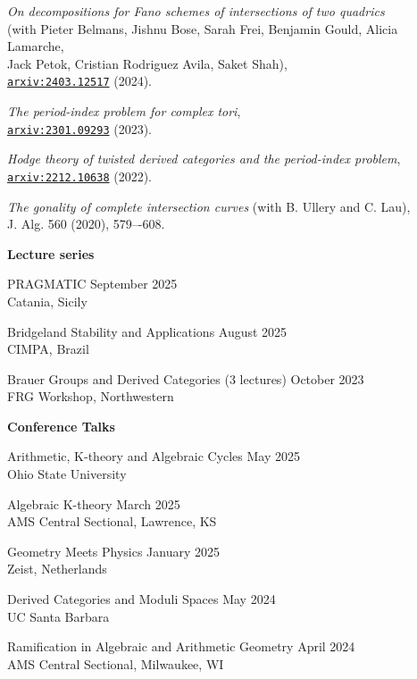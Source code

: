 \documentclass[11 pt]{letter}
\begin{document}
	\emph{On decompositions for Fano schemes of intersections of two quadrics} \\ 
	\indent (with Pieter Belmans, Jishnu Bose, Sarah Frei, Benjamin Gould, Alicia Lamarche, \\
	\indent Jack Petok, Cristian Rodriguez Avila, Saket Shah), \\
	\indent \href{https://arxiv.org/abs/2403.12517}{\nolinkurl{arxiv:2403.12517}} (2024).

	\emph{The period-index problem for complex tori}, \\
	\indent \href{https://arxiv.org/abs/2301.09293}{\nolinkurl{arxiv:2301.09293}} (2023).

	\emph{Hodge theory of twisted derived categories and the period-index problem}, \\ 
	\indent \href{https://arxiv.org/abs/2212.10638}{\nolinkurl{arxiv:2212.10638}} (2022).

	\emph{The gonality of complete intersection curves} (with B. Ullery and C. Lau), \\
	\indent J. Alg. 560 (2020), 579–-608.


	\medskip
	\noindent
	\textbf{\large{Lecture series}}

	PRAGMATIC \hfill September 2025 \\
	\indent Catania, Sicily

	Bridgeland Stability and Applications \hfill August 2025 \\
	\indent CIMPA, Brazil

	Brauer Groups and Derived Categories (3 lectures) \hfill October 2023 \\
	\indent FRG Workshop, Northwestern

	\medskip
	\noindent
	\textbf{\large{Conference Talks}}

	Arithmetic, K-theory and Algebraic Cycles \hfill May 2025 \\
	\indent Ohio State University

	Algebraic K-theory \hfill March 2025 \\
	\indent AMS Central Sectional, Lawrence, KS

	Geometry Meets Physics \hfill January 2025 \\
	\indent Zeist, Netherlands

	Derived Categories and Moduli Spaces \hfill May 2024 \\
	\indent UC Santa Barbara

	Ramification in Algebraic and Arithmetic Geometry \hfill April 2024 \\
	\indent AMS Central Sectional, Milwaukee, WI
\end{document}
